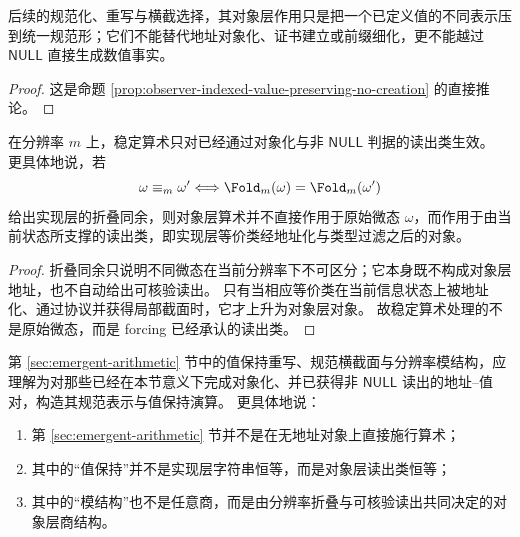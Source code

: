 \begin{corollary}[规范化不创造事实]\label{cor:observer-indexed-normalization-no-fact-creation}
后续的规范化、重写与横截选择，其对象层作用只是把一个已定义值的不同表示压到统一规范形；它们不能替代地址对象化、证书建立或前缀细化，更不能越过 \(\mathsf{NULL}\) 直接生成数值事实。
\end{corollary}

\begin{proof}
这是命题 \ref{prop:observer-indexed-value-preserving-no-creation} 的直接推论。
\end{proof}

\begin{proposition}[有限分辨率算术的对象层资格]\label{prop:observer-indexed-finite-resolution-object-eligibility}
在分辨率 \(m\) 上，稳定算术只对已经通过对象化与非 \(\mathsf{NULL}\) 判据的读出类生效。
更具体地说，若
\[
\omega\equiv_m\omega'
\Longleftrightarrow
\Fold_m(\omega)=\Fold_m(\omega')
\]
给出实现层的折叠同余，则对象层算术并不直接作用于原始微态 \(\omega\)，而作用于由当前状态所支撑的读出类，即实现层等价类经地址化与类型过滤之后的对象。
\end{proposition}

\begin{proof}
折叠同余只说明不同微态在当前分辨率下不可区分；它本身既不构成对象层地址，也不自动给出可核验读出。
只有当相应等价类在当前信息状态上被地址化、通过协议并获得局部截面时，它才上升为对象层对象。
故稳定算术处理的不是原始微态，而是 forcing 已经承认的读出类。
\end{proof}

\begin{corollary}\label{cor:observer-indexed-reading-of-emergent-arithmetic}
第 \ref{sec:emergent-arithmetic} 节中的值保持重写、规范横截面与分辨率模结构，应理解为对那些已经在本节意义下完成对象化、并已获得非 \(\mathsf{NULL}\) 读出的地址--值对，构造其规范表示与值保持演算。
更具体地说：
\begin{enumerate}
  \item 第 \ref{sec:emergent-arithmetic} 节并不是在无地址对象上直接施行算术；
  \item 其中的“值保持”并不是实现层字符串恒等，而是对象层读出类恒等；
  \item 其中的“模结构”也不是任意商，而是由分辨率折叠与可核验读出共同决定的对象层商结构。
\end{enumerate}
\end{corollary}

